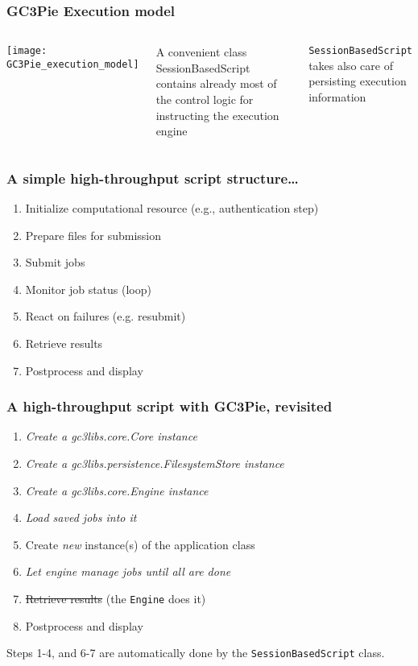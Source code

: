 \documentclass[english,serif,mathserif,xcolor=pdftex,dvipsnames,table]{beamer}
\begin{document}
\begin{frame}
  \frametitle{GC3Pie Execution model}
  \begin{columns}
      \texttt{[image: GC3Pie\_execution\_model]}
  \begin{block}{}
    A convenient class {\color{Blue}SessionBasedScript} contains already
    most of the control logic for instructing the execution engine
  \end{block}

  \begin{block}{}
    \texttt{SessionBasedScript} takes also care of {\color{Blue}persisting}
    execution information
  \end{block}
  \end{columns}
\end{frame}


\begin{frame}
  \frametitle{A simple high-throughput script structure\ldots{}}
  
  \begin{enumerate}
  \item Initialize computational resource (e.g., authentication step)
  \item Prepare files for submission
  \item Submit jobs
  \item Monitor job status (loop)
  \item React on failures (e.g. resubmit)
  \item Retrieve results
  \item Postprocess and display
  \end{enumerate}
\end{frame}

\begin{frame}
  \frametitle{A high-throughput script with GC3Pie, revisited}
  
  \begin{enumerate}
  \item \emph{Create a gc3libs.core.Core instance}
  \item \emph{Create a gc3libs.persistence.FilesystemStore instance}
  \item \emph{Create a gc3libs.core.Engine instance}
  \item \emph{Load saved jobs into it}
  \item Create \emph{new} instance(s) of the application class
  \item \emph{Let engine manage jobs until all are done}
  \item \sout{Retrieve results} (the \texttt{Engine} does it)
  \item Postprocess and display
  \end{enumerate}
  
  Steps 1-4, and 6-7 are automatically done by the
  \texttt{SessionBasedScript} class.
\end{frame}
\end{document}

